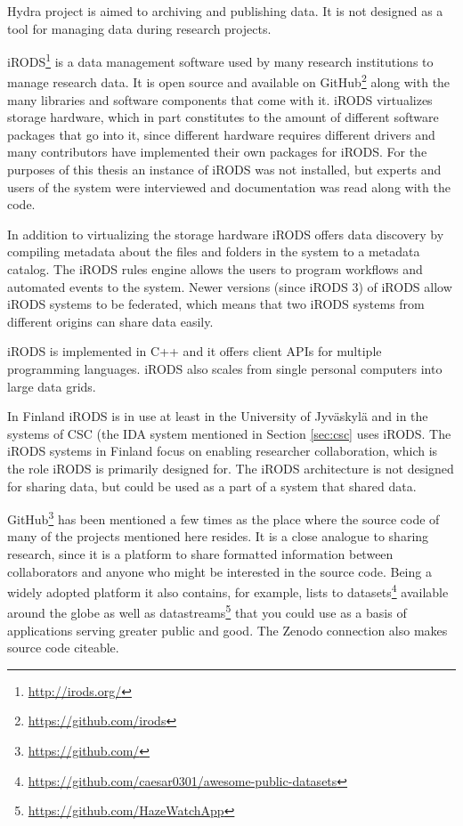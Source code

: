 Hydra project is aimed to archiving and publishing data. It is not designed as
a tool for managing data during research projects.

iRODS\footnote{\url{http://irods.org/}} is a data management software used by many research institutions to
manage research data. It is open source and available on GitHub\footnote{\url{https://github.com/irods}}
along with the many libraries and software components that come with it. iRODS
virtualizes storage hardware, which in part constitutes to the amount of
different software packages that go into it, since different hardware requires
different drivers and many contributors have implemented their own packages for
iRODS. For the purposes of this thesis an instance of iRODS was not installed,
but experts and users of the system were interviewed and documentation was read
along with the code.

In addition to virtualizing the storage hardware iRODS offers data discovery
by compiling metadata about the files and folders in the system to a metadata
catalog. The iRODS rules engine allows the users to program workflows and
automated events to the system. Newer versions (since iRODS 3) of iRODS allow
iRODS systems to be federated, which means that two iRODS systems from
different origins can share data easily.

iRODS is implemented in C++ and it offers client APIs for multiple programming
languages. iRODS also scales from single personal computers into large data
grids.

In Finland iRODS is in use at least in the University of Jyväskylä and in the
systems of CSC (the IDA system mentioned in Section \ref{sec:csc} uses iRODS.
The iRODS systems in Finland focus on enabling researcher collaboration, which
is the role iRODS is primarily designed for. The iRODS architecture is not
designed for sharing data, but could be used as a part of a system that shared
data.

GitHub\footnote{\url{https://github.com/}} has been mentioned a few times as
the place where the source code of many of the projects mentioned here resides.
It is a close analogue to sharing research, since it is a platform to share
formatted information between collaborators and anyone who might be interested
in the source code. Being a widely adopted platform it also contains, for
example, lists to datasets\footnote{\url{https://github.com/caesar0301/awesome-public-datasets}}
available around the globe as well as datastreams\footnote{\url{https://github.com/HazeWatchApp}}
that you could use as a basis of applications serving greater public and good.
The Zenodo connection also makes source code citeable.

